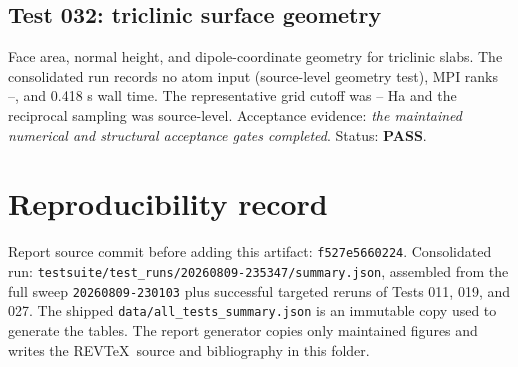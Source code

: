 \documentclass[aps,prb,preprint,superscriptaddress,longbibliography,floatfix]{revtex4-2}
\newcommand{\code}[1]{\texttt{#1}}
\begin{document}
\subsection{Test 032: triclinic surface geometry}
Face area, normal height, and dipole-coordinate geometry for triclinic slabs. The consolidated run records no atom input (source-level geometry test), MPI ranks --, and 0.418 s wall time. The representative grid cutoff was -- Ha and the reciprocal sampling was source-level. Acceptance evidence: \emph{the maintained numerical and structural acceptance gates completed}. Status: \textbf{PASS}.

\section{Reproducibility record}
Report source commit before adding this artifact: \code{f527e5660224}. Consolidated run: \code{testsuite/test\_runs/20260809-235347/summary.json}, assembled from the full sweep \code{20260809-230103} plus successful targeted reruns of Tests 011, 019, and 027. The shipped \code{data/all\_tests\_summary.json} is an immutable copy used to generate the tables. The report generator copies only maintained figures and writes the REV\TeX\ source and bibliography in this folder.


\end{document}
